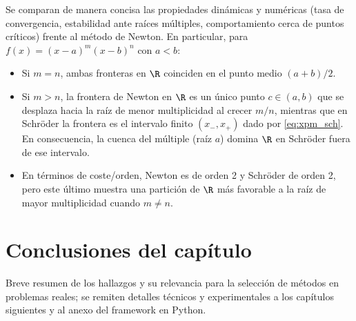 Se comparan de manera concisa las propiedades dinámicas y numéricas (tasa de convergencia, estabilidad ante raíces múltiples, comportamiento cerca de puntos críticos) frente al método de Newton. En particular, para $f(x)=(x-a)^m(x-b)^n$ con $a<b$:
\begin{itemize}
\item Si $m=n$, ambas fronteras en $\R$ coinciden en el punto medio $(a+b)/2$.
\item Si $m>n$, la frontera de Newton en $\R$ es un único punto $c\in(a,b)$ que se desplaza hacia la raíz de menor multiplicidad al crecer $m/n$, mientras que en Schr\"oder la frontera es el intervalo finito $(x_{-},x_{+})$ dado por \eqref{eq:xpm_sch}. En consecuencia, la cuenca del múltiple (raíz $a$) domina $\R$ en Schr\"oder fuera de ese intervalo.
\item En términos de coste/orden, Newton es de orden 2 y Schr\"oder de orden 2, pero este último muestra una partición de $\R$ más favorable a la raíz de mayor multiplicidad cuando $m\ne n$.
\end{itemize}

\section{Conclusiones del capítulo}

Breve resumen de los hallazgos y su relevancia para la selección de métodos en problemas reales; se remiten detalles técnicos y experimentales a los capítulos siguientes y al anexo del framework en Python.
